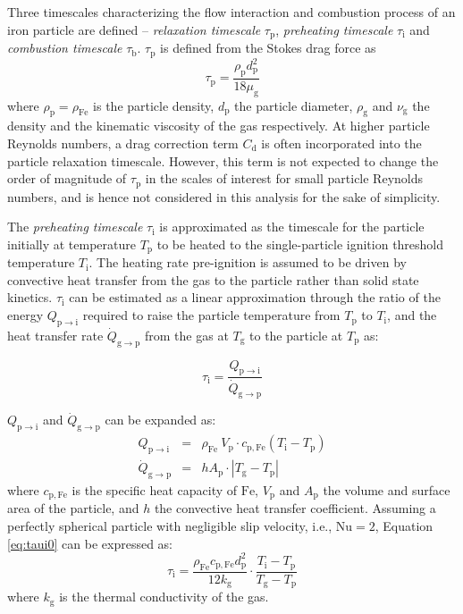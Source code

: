\documentclass[authoryear,preprint,review,12pt]{elsarticle}
\newcommand{\mrm}[1]{\mathrm{#1}}
\newcommand{\taup}{\tau_\mathrm{p}}
\newcommand{\taui}{\tau_\mathrm{i}}
\newcommand{\red}{}
\newcommand{\blue}{}
\begin{document}
Three timescales characterizing the flow interaction and combustion process of an iron particle are defined -- \textit{relaxation timescale} $\tau_\mathrm{p}$, \textit{preheating timescale} $\tau_\mathrm{i}$ and \textit{combustion timescale} $\tau_\mathrm{b}$. $\taup$ is defined from the Stokes drag force as
\begin{equation}
    \taup = \frac{\rho_\mrm{p} d_\mrm{p}^2}{18 \mu_\mrm{g}} \label{eq:taup}
\end{equation}
\noindent where $\rho_\mrm{p} = \rho_\mrm{Fe}$ is the particle density, $d_\mrm{p}$ the particle diameter, $\rho_\mrm{g}$ and $\nu_\mrm{g}$ the density and the kinematic viscosity of the gas respectively. {\red At higher particle Reynolds numbers, a drag correction term $C_\mrm{d}$ is often incorporated into the particle relaxation timescale. However, this term is not expected to change the order of magnitude of $\taup$ in the scales of interest for small particle Reynolds numbers, and is hence not considered in this analysis for the sake of simplicity.}

The \textit{preheating timescale} $\tau_\mrm{i}$ is approximated as the timescale for the particle initially at temperature $T_\mrm{p}$ to be heated to the single-particle ignition threshold temperature $T_\mrm{i}$. The heating rate pre-ignition is assumed to be driven by convective heat transfer from the gas to the particle rather than solid state kinetics. $\taui$ can be estimated as a linear approximation through the ratio of the energy $Q_{\mrm{p} \rightarrow \mrm{i}}$ required to raise the particle temperature from $T_\mrm{p}$ to $T_\mrm{i}$, and the heat transfer rate $\dot{Q}_{\mrm{g} \rightarrow \mrm{p}}$ from the gas at $T_\mrm{g}$ to the particle at $T_\mrm{p}$ as:
{\blue
\begin{equation}
    \taui =  \frac{Q_{\mrm{p} \rightarrow \mrm{i}}}{\dot{Q}_{\mrm{g} \rightarrow \mrm{p}}} \label{eq:taui0}
\end{equation}

\noindent$Q_{\mrm{p} \rightarrow \mrm{i}}$ and $\dot{Q}_{\mrm{g} \rightarrow \mrm{p}}$ can be expanded as:
\begin{eqnarray}
    Q_{\mrm{p} \rightarrow \mrm{i}} &=& \rho_\mathrm{Fe} \ V_\mathrm{p}\cdot c_\mathrm{p,Fe}(T_\mathrm{i} - T_\mathrm{p})\\
    \dot{Q}_{\mrm{g} \rightarrow \mrm{p}} &=& hA_\mathrm{p} \cdot |T_\mathrm{g} - T_\mathrm{p}|
\end{eqnarray}
\noindent where $c_\mrm{p,Fe}$ is the specific heat capacity of $\mrm{Fe}$, $V_\mrm{p}$ and $A_\mrm{p}$ the volume and surface area of the particle, and $h$ the convective heat transfer coefficient. Assuming a perfectly spherical particle with negligible slip velocity, i.e., $\mrm{Nu}=2$, Equation \ref{eq:taui0} can be expressed as:
\begin{equation}
    \taui = \frac{\rho_\mrm{Fe} c_\mrm{p,Fe} d_\mrm{p}^2}{12 k_\mrm{g}} \cdot \frac{T_\mrm{i} - T_\mrm{p}}{T_\mrm{g} - T_\mrm{p}} \label{eq:taui}
\end{equation}
where $k_\mrm{g}$ is the thermal conductivity of the gas.}
\end{document}
